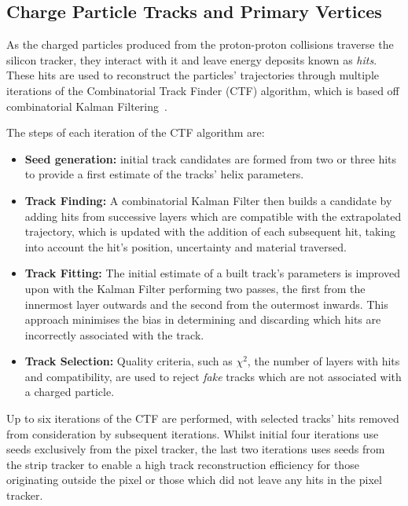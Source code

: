 {\subsection{Charge Particle Tracks and Primary Vertices}
As the charged particles produced from the proton-proton collisions traverse the silicon tracker, they interact with it and leave energy deposits known as \emph{hits}.
These hits are used to reconstruct the particles' trajectories through multiple iterations of the Combinatorial Track Finder (CTF) algorithm, which is based off combinatorial Kalman Filtering~\cite{Chatrchyan:2014fea,Fruhwirth:1987fm}.

The steps of each iteration	of the CTF algorithm are:
\begin{itemize}
\item \textbf{Seed generation:} initial track candidates are formed from two or three hits to provide a first estimate of the tracks' helix parameters.
\item \textbf{Track Finding:} A combinatorial Kalman Filter then builds a candidate by adding hits from successive layers which are compatible with the extrapolated trajectory, which is updated with the addition of each subsequent hit, taking into account the hit's position, uncertainty and material traversed.
\item \textbf{Track Fitting:} The initial estimate of a built track's parameters is improved upon with the Kalman Filter performing two passes, the first from the innermost layer outwards and the second from the outermost inwards.
This approach minimises the bias in determining and discarding which hits are incorrectly associated with the track.
\item \textbf{Track Selection:} Quality criteria, such as $\chi^{2}$, the number of layers with hits and compatibility, are used to reject \emph{fake} tracks which are not associated with a charged particle.
\end{itemize}

Up to six iterations of the CTF are performed, with selected tracks' hits removed from consideration by subsequent iterations.
Whilst initial four iterations use seeds exclusively from the pixel tracker, the last two iterations uses seeds from the strip tracker to enable a high track reconstruction efficiency for those originating outside the pixel or those which did not leave any hits in the pixel tracker.

}
